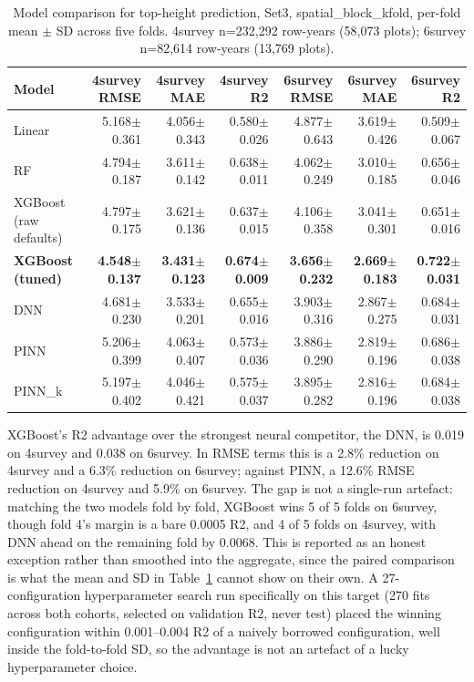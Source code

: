 \documentclass[11pt,a4paper]{report}
\begin{document}
\begin{table}[!htbp]
\centering
\scriptsize
\renewcommand{\arraystretch}{1.2}
\begin{tabular}{lrrrrrr}
\toprule
Model & 4survey RMSE & 4survey MAE & 4survey R2 & 6survey RMSE & 6survey MAE & 6survey R2 \\
\midrule
Linear & 5.168$\pm$0.361 & 4.056$\pm$0.343 & 0.580$\pm$0.026 & 4.877$\pm$0.643 & 3.619$\pm$0.426 & 0.509$\pm$0.067 \\
RF & 4.794$\pm$0.187 & 3.611$\pm$0.142 & 0.638$\pm$0.011 & 4.062$\pm$0.249 & 3.010$\pm$0.185 & 0.656$\pm$0.046 \\
XGBoost (raw defaults) & 4.797$\pm$0.175 & 3.621$\pm$0.136 & 0.637$\pm$0.015 & 4.106$\pm$0.358 & 3.041$\pm$0.301 & 0.651$\pm$0.016 \\
\textbf{XGBoost (tuned)} & \textbf{4.548$\pm$0.137} & \textbf{3.431$\pm$0.123} & \textbf{0.674$\pm$0.009} & \textbf{3.656$\pm$0.232} & \textbf{2.669$\pm$0.183} & \textbf{0.722$\pm$0.031} \\
DNN & 4.681$\pm$0.230 & 3.533$\pm$0.201 & 0.655$\pm$0.016 & 3.903$\pm$0.316 & 2.867$\pm$0.275 & 0.684$\pm$0.031 \\
PINN & 5.206$\pm$0.399 & 4.063$\pm$0.407 & 0.573$\pm$0.036 & 3.886$\pm$0.290 & 2.819$\pm$0.196 & 0.686$\pm$0.038 \\
PINN\_k & 5.197$\pm$0.402 & 4.046$\pm$0.421 & 0.575$\pm$0.037 & 3.895$\pm$0.282 & 2.816$\pm$0.196 & 0.684$\pm$0.038 \\
\bottomrule
\end{tabular}
\caption{Model comparison for top-height prediction, Set3, spatial\_block\_kfold,
per-fold mean $\pm$ SD across five folds. 4survey n=232{,}292 row-years (58{,}073
plots); 6survey n=82{,}614 row-years (13{,}769 plots).}
\label{tab:results-rq1}
\end{table}

XGBoost's R2 advantage over the strongest neural competitor, the DNN, is 0.019 on
4survey and 0.038 on 6survey. In RMSE terms this is a 2.8\% reduction on 4survey and a
6.3\% reduction on 6survey; against PINN, a 12.6\% RMSE reduction on 4survey and 5.9\%
on 6survey. The gap is not a single-run artefact: matching the two models fold by
fold, XGBoost wins 5 of 5 folds on 6survey, though fold 4's margin is a bare 0.0005 R2,
and 4 of 5 folds on 4survey, with DNN ahead on the remaining fold by 0.0068. This is
reported as an honest exception rather than smoothed into the aggregate, since the
paired comparison is what the mean and SD in Table~\ref{tab:results-rq1} cannot show
on their own. A 27-configuration hyperparameter search run specifically on this
target (270 fits across both cohorts, selected on validation R2, never test) placed
the winning configuration within 0.001--0.004 R2 of a naively borrowed configuration,
well inside the fold-to-fold SD, so the advantage is not an artefact of a lucky
hyperparameter choice.
\end{document}
